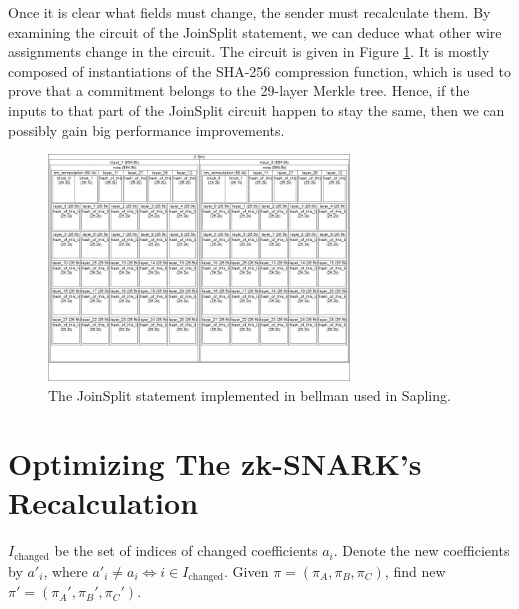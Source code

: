 \documentclass{article}
\begin{document}
Once it is clear what fields must change, the sender must recalculate them.
By examining the circuit of the JoinSplit statement, we can deduce what other wire assignments change in the circuit.
The circuit is given in Figure \ref{fig:joinsplit-circuit}.
It is mostly composed of instantiations of the SHA-256 compression function, which is used to prove that a commitment belongs to the 29-layer Merkle tree.
Hence, if the inputs to that part of the JoinSplit circuit happen to stay the same, then we can possibly gain big performance improvements.

\begin{figure}[t]
\includegraphics[width=8cm]{images/joinsplit-groth16-circuit.jpeg}
\caption{The JoinSplit statement implemented in bellman used in Sapling.} \label{fig:joinsplit-circuit}
\centering
\end{figure}

\section{Optimizing The zk-SNARK's Recalculation}

$I_\text{changed}$ be the set of indices of changed coefficients $a_i$.
Denote the new coefficients by $a'_i$, where $a'_i \neq a_i \iff i \in I_\text{changed}$.
Given $\pi = (\pi_A, \pi_B, \pi_C)$, find new $\pi' = (\pi_A', \pi_B', \pi_C')$.
\end{document}
